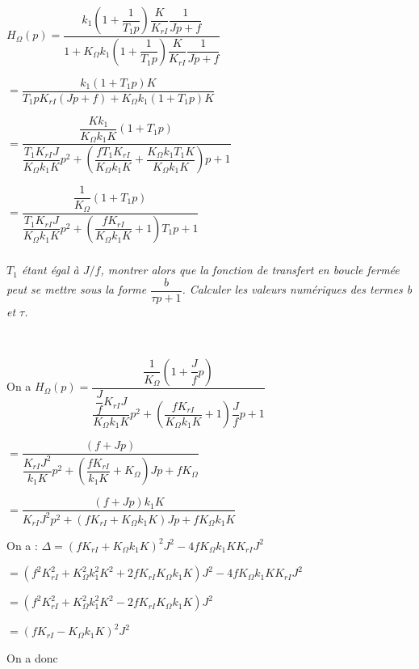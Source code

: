\documentclass[10pt,fleqn]{article} %
\begin{document}
\begin{multicols}{2}
\ifprof
\begin{corrige}
$H_{\Omega}(p)=\dfrac{k_{1}\left( 1 + \dfrac{1}{T_{1}p} \right)\dfrac{K}{K_{rI}}\dfrac{1}{Jp+f}}{1+ K_{\Omega}k_{1}\left( 1 +\dfrac{1}{T_{1}p} \right)\dfrac{K}{K_{rI}}\dfrac{1}{Jp+f}}$

$=\dfrac{k_{1}\left( 1 + T_{1}p \right)K}{T_{1}p K_{rI}\left(Jp+f\right) + K_{\Omega}k_{1}\left(1+ T_{1}p\right) K}$

$=\dfrac{\dfrac{Kk_{1}}{K_{\Omega}k_{1}K}\left( 1 + T_{1}p \right)}{\dfrac{T_{1} K_{rI}J}{K_{\Omega}k_{1}K}p^2+\left(\dfrac{fT_{1} K_{rI}}{K_{\Omega}k_{1}K}+\dfrac{K_{\Omega}k_{1}T_{1}K}{K_{\Omega}k_{1}K}\right)p + 1 }$


$=\dfrac{\dfrac{1}{K_{\Omega}}\left( 1 + T_{1}p \right)}{\dfrac{T_{1} K_{rI}J}{K_{\Omega}k_{1}K}p^2+\left(\dfrac{f K_{rI}}{K_{\Omega}k_{1}K}+1\right)T_{1}p + 1 }$

\end{corrige}
\else
\fi

\subparagraph{}\textit{$T_1$ étant égal à $J/f$, montrer alors que
  la fonction de transfert en boucle fermée peut se mettre sous la forme
  \(\dfrac{b}{\tau p + 1}\). Calculer les valeurs numériques des termes
  \emph{b} et \emph{$\tau$}.}

\ifprof
\begin{corrige}~\\

\footnotesize

On a 
$H_{\Omega}(p)=\dfrac{\dfrac{1}{K_{\Omega}}\left( 1 + \dfrac{J}{f}p \right)}{\dfrac{\dfrac{J}{f} K_{rI}J}{K_{\Omega}k_{1}K}p^2+\left(\dfrac{f K_{rI}}{K_{\Omega}k_{1}K}+1\right)\dfrac{J}{f}p + 1 }$

$=\dfrac{\left( f + Jp \right)}{\dfrac{ K_{rI}J^2}{k_{1}K}p^2+\left(\dfrac{f K_{rI}}{k_{1}K}+K_{\Omega}\right)Jp + fK_{\Omega}}$

$=\dfrac{\left( f + Jp \right)k_{1}K}{ K_{rI}J^2p^2+\left(f K_{rI}+K_{\Omega}k_{1}K\right)Jp + fK_{\Omega}k_{1}K}$


On a :
$\Delta =\left(f K_{rI}+K_{\Omega}k_{1}K\right)^2J^2 -4 fK_{\Omega}k_{1}KK_{rI}J^2 $ 

$=\left(f^2 K_{rI}^2+K_{\Omega}^2k_{1}^2K^2+2f K_{rI}K_{\Omega}k_{1}K\right)J^2 -4 fK_{\Omega}k_{1}KK_{rI}J^2 $

$=\left(f^2 K_{rI}^2+K_{\Omega}^2k_{1}^2K^2-2f K_{rI}K_{\Omega}k_{1}K\right)J^2  $

$=\left(f K_{rI}-K_{\Omega}k_{1}K\right)^2J^2  $

On a donc 


\end{corrige}
\end{multicols}
\end{document}
